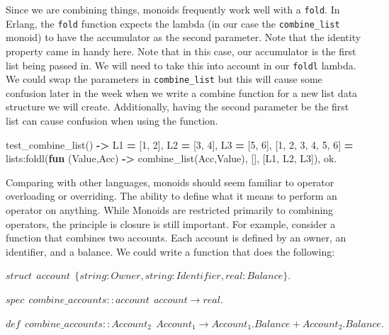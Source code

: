 \documentclass[
]{book}
\newenvironment{Shaded}{\begin{snugshade}}{\end{snugshade}}
\newcommand{\CharTok}[1]{\textcolor[rgb]{0.31,0.60,0.02}{#1}}
\newcommand{\DecValTok}[1]{\textcolor[rgb]{0.00,0.00,0.81}{#1}}
\newcommand{\FunctionTok}[1]{\textcolor[rgb]{0.00,0.00,0.00}{#1}}
\newcommand{\KeywordTok}[1]{\textcolor[rgb]{0.13,0.29,0.53}{\textbf{#1}}}
\newcommand{\OperatorTok}[1]{\textcolor[rgb]{0.81,0.36,0.00}{\textbf{#1}}}
\newcommand{\VariableTok}[1]{\textcolor[rgb]{0.00,0.00,0.00}{#1}}
\begin{document}
Since we are combining things, monoids frequently work well with a \texttt{fold}. In Erlang, the \texttt{fold} function expects the lambda (in our case the \texttt{combine\_list} monoid) to have the accumulator as the second parameter. Note that the identity property came in handy here. Note that in this case, our accumulator is the first list being passed in. We will need to take this into account in our \texttt{foldl} lambda. We could swap the parameters in \texttt{combine\_list} but this will cause some confusion later in the week when we write a combine function for a new list data structure we will create. Additionally, having the second parameter be the first list can cause confusion when using the function.

\begin{Shaded}
\begin{Highlighting}[]
\FunctionTok{test\_combine\_list()} \OperatorTok{{-}\textgreater{}}
    \VariableTok{L1} \OperatorTok{=} \FunctionTok{[}\DecValTok{1}\FunctionTok{,} \DecValTok{2}\FunctionTok{],}
    \VariableTok{L2} \OperatorTok{=} \FunctionTok{[}\DecValTok{3}\FunctionTok{,} \DecValTok{4}\FunctionTok{],}
    \VariableTok{L3} \OperatorTok{=} \FunctionTok{[}\DecValTok{5}\FunctionTok{,} \DecValTok{6}\FunctionTok{],}
    \FunctionTok{[}\DecValTok{1}\FunctionTok{,} \DecValTok{2}\FunctionTok{,} \DecValTok{3}\FunctionTok{,} \DecValTok{4}\FunctionTok{,} \DecValTok{5}\FunctionTok{,} \DecValTok{6}\FunctionTok{]} \OperatorTok{=} \FunctionTok{lists:foldl(}\KeywordTok{fun} \FunctionTok{(}\VariableTok{Value}\FunctionTok{,}\VariableTok{Acc}\FunctionTok{)} \OperatorTok{{-}\textgreater{}} \FunctionTok{combine\_list(}\VariableTok{Acc}\FunctionTok{,}\VariableTok{Value}\FunctionTok{),} \FunctionTok{[],} \FunctionTok{[}\VariableTok{L1}\FunctionTok{,} \VariableTok{L2}\FunctionTok{,} \VariableTok{L3}\FunctionTok{]),}
    \CharTok{ok}\FunctionTok{.}
\end{Highlighting}
\end{Shaded}

Comparing with other languages, monoids should seem familiar to operator overloading or overriding. The ability to define what it means to perform an operator on anything. While Monoids are restricted primarily to combining operators, the principle is closure is still important. For example, consider a function that combines two accounts. Each account is defined by an owner, an identifier, and a balance. We could write a function that does the following:

\begin{formulabox}
\(struct ~ ~ account ~ ~ \lbrace string:Owner, string:Identi\mathit{f}ier, real:Balance \rbrace.\)

\(spec ~ ~ combine\_accounts :: account ~~ account \rightarrow real.\)

\(de\mathit{f} ~ ~ combine\_accounts :: Account_2 ~~ Account_1 \rightarrow Account_1.Balance + Account_2.Balance.\)

\end{formulabox}
\end{document}
